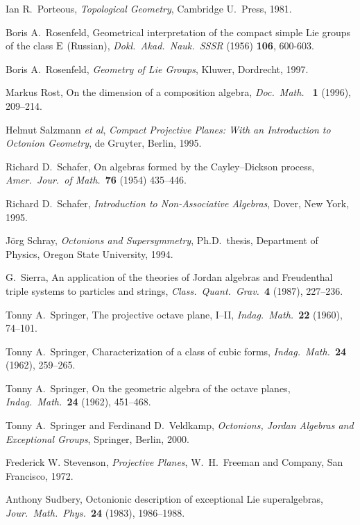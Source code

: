 \documentclass[12pt]{article}
\newcommand{\E}{{\rm E}}
\begin{document}
\begin{thebibliography}{10}
 Ian R.\ Porteous, {\sl Topological Geometry},    
Cambridge U.\ Press, 1981.   

 Boris A.\ Rosenfeld, Geometrical interpretation of
the compact simple Lie groups of the class $\E$ (Russian), {\sl
Dokl.\ Akad.\ Nauk.\ SSSR} (1956) {\bf 106}, 600-603.

 Boris A.\ Rosenfeld, {\sl Geometry of Lie Groups},    
Kluwer, Dordrecht, 1997.   

 Markus Rost, On the dimension of a composition algebra, 
{\sl Doc.\ Math.\ } {\bf 1} (1996), 209--214.  

 Helmut Salzmann {\it et al}, {\sl Compact Projective
Planes: With an Introduction to Octonion Geometry}, de Gruyter, Berlin,
1995.

 Richard D.\ Schafer, On algebras formed by the    
Cayley--Dickson process, {\sl Amer.\ Jour.\ of Math.\ }{\bf 76} (1954)   
435--446.   
  
 Richard D.\ Schafer, {\sl Introduction to Non-Associative 
Algebras}, Dover, New York, 1995.   

 J\"org Schray, {\sl Octonions and Supersymmetry},
Ph.D.\ thesis, Department of Physics, Oregon State University, 1994.
 
 G.\ Sierra, An application of the theories of Jordan 
algebras and Freudenthal triple systems to particles and strings,  
{\sl Class.\ Quant.\ Grav.\ }{\bf 4} (1987), 227--236.

 Tonny A.\ Springer, The projective octave plane, I--II, 
{\sl Indag.\ Math.\ }{\bf 22} (1960), 74--101. 
  
 Tonny A.\ Springer, Characterization of a class of
cubic forms, {\sl Indag.\ Math.\ }{\bf 24} (1962), 259--265.

 Tonny A.\ Springer, On the geometric algebra of 
the octave planes, {\sl Indag.\ Math.\ }{\bf 24} (1962), 451--468.
 
 Tonny A.\ Springer and Ferdinand D.\ Veldkamp,    
{\sl Octonions, Jordan Algebras and Exceptional Groups}, Springer,   
Berlin, 2000.   
 
 Frederick W. Stevenson, {\sl Projective Planes}, W.\ H.\ 
Freeman and Company, San Francisco, 1972. 
 
 Anthony Sudbery, Octonionic description of exceptional 
Lie superalgebras, {\sl Jour.\ Math.\ Phys.\ }{\bf 24} (1983), 1986--1988. 
 

\end{thebibliography}
\end{document}
